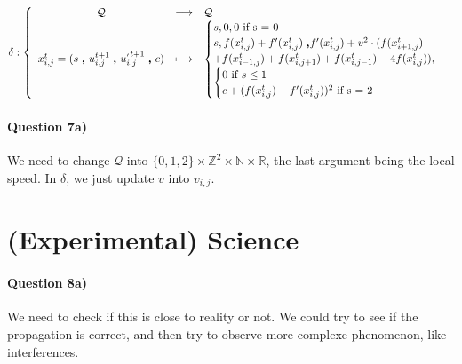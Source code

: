 \documentclass[a4paper,12pt]{article}
\begin{document}
\begin{eqnarray*}
\delta : \left \{ \begin{array}{c c l }
  \mathcal{Q} & \longrightarrow & \mathcal{Q} \\
  x_{i,j}^t = (s \ \pmb{,} \ u^{t+1}_{i,j}\ \pmb{,} \ u^{_{'} t+1}_{i,j} \ \pmb{,} \ c) & \longmapsto &
  \begin{cases}s, 0, 0\mbox{ if s = 0}\\
    s, f(x^{t}_{i,j}) + f'(x^t_{i,j})\ \pmb{,} f'(x^t_{i,j}) + v^2 \cdot (f(x^t_{i+1,j}) \\+ f(x^t_{i-1, j}) + f(x^t_{i, j+1}) + f(x^t_{i, j-1}) - 4 f(x^t_{i, j})),\\
    \begin{cases} 0 \mbox{ if }s \leq 1\\
      c + (f(x^{t}_{i,j}) + f'(x^t_{i,j}))^2 \mbox{ if s = 2} \\
    \end{cases}
  \end{cases}
  \end{array} \right .
\end{eqnarray*}


\paragraph{Question 7a)} We need to change $\mathcal{Q}$ into $\{0,1,2\} \times \mathbb{Z}^2 \times \mathbb{N} \times \mathbb{R}$, the last argument being the local speed. In $\delta$, we just update $v$ into $v_{i,j}$.


\section{(Experimental) Science}

\paragraph{Question 8a)} We need to check if this is close to reality or not. We could try to see if the propagation is correct, and then try to observe more complexe phenomenon, like interferences.
\end{document}

